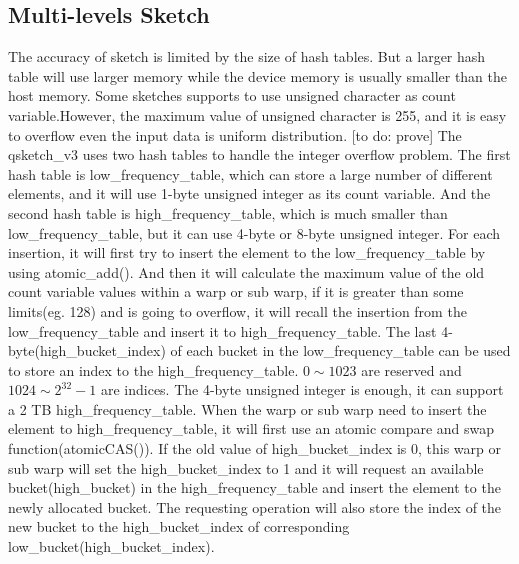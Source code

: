 \documentclass[conference]{IEEEtran}
\begin{document}


\subsection{Multi-levels Sketch}
The accuracy of sketch is limited by the size of hash tables. But a larger hash table will use larger memory while the device memory is usually smaller than the host memory. Some sketches supports to use unsigned character as count variable.However, the maximum value of unsigned character is 255, and it is easy to overflow even the input data is uniform distribution.
[to do:  prove]
The qsketch\_v3 uses two hash tables to handle the integer overflow problem. The first hash table is low\_frequency\_table, which can store a large number of different elements, and it will use 1-byte unsigned integer as its count variable. And the second hash table is high\_frequency\_table, which is much smaller than low\_frequency\_table, but it can use 4-byte or 8-byte unsigned integer. For each insertion, it will first try to insert the element to the low\_frequency\_table by using atomic\_add(). And then it will calculate the maximum value of the old count variable values within a warp or sub warp, if it is greater than some limits(eg. 128) and is going to overflow, it will recall the insertion from the low\_frequency\_table and insert it to high\_frequency\_table. 
The last 4-byte(high\_bucket\_index) of each bucket in the low\_frequency\_table can be used to store an index to the high\_frequency\_table. $0 \sim 1023$ are reserved and $1024 \sim 2 ^ {32} - 1$ are indices. The 4-byte unsigned integer is enough, it can support a 2 TB high\_frequency\_table. When the warp or sub warp need to insert the element to high\_frequency\_table, it will first use an atomic compare and swap function(atomicCAS()). If the old value of high\_bucket\_index is 0, this warp or sub warp will set the high\_bucket\_index to 1 and it will request an available bucket(high\_bucket) in the high\_frequency\_table and insert the element to the newly allocated bucket. The requesting operation will also store the index of the new bucket to the high\_bucket\_index of corresponding low\_bucket(high\_bucket\_index). 
\end{document}
